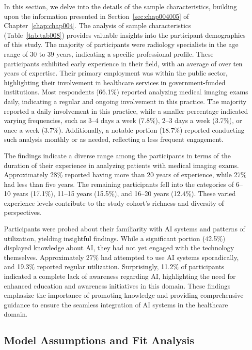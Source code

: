 In this section, we delve into the details of the sample characteristics, building upon the information presented in Section~\ref{sec:chap004005} of Chapter~\ref{chap:chap004}.
The analysis of sample characteristics (Table~\ref{tab:tab008}) provides valuable insights into the participant demographics of this study.
The majority of participants were radiology specialists in the age range of 30 to 39 years, indicating a specific professional profile.
These participants exhibited early experience in their field, with an average of over ten years of expertise.
Their primary employment was within the public sector, highlighting their involvement in healthcare services in government-funded institutions.
Most respondents (66.1\%) reported analyzing medical imaging exams daily, indicating a regular and ongoing involvement in this practice.
The majority reported a daily involvement in this practice, while a smaller percentage indicated varying frequencies, such as 3--4 days a week (7.8\%), 2--3 days a week (3.7\%), or once a week (3.7\%).
Additionally, a notable portion (18.7\%) reported conducting such analysis monthly or as needed, reflecting a less frequent engagement.

The findings indicate a diverse range among the participants in terms of the duration of their experience in analyzing patients with medical imaging exams.
Approximately 28\% reported having more than 20 years of experience, while 27\% had less than five years.
The remaining participants fell into the categories of 6--10 years (17.1\%), 11--15 years (15.5\%), and 16--20 years (12.4\%).
These varied experience levels contribute to the study cohort's richness and diversity of perspectives.

Participants were probed about their familiarity with \ac{AI} systems and patterns of utilization, yielding insightful findings.
While a significant portion (42.5\%) displayed knowledge about \ac{AI}, they had not yet engaged with the technology themselves.
Approximately 27\% had attempted to use \ac{AI} systems sporadically, and 19.3\% reported regular utilization.
Surprisingly, 11.2\% of participants indicated a complete lack of awareness regarding \ac{AI}, highlighting the need for enhanced education and awareness initiatives in this domain.
These findings emphasize the importance of promoting knowledge and providing comprehensive guidance to ensure the seamless integration of \ac{AI} systems in the healthcare domain.

\subsection{Model Assumptions and Fit Analysis}
\label{chap:app002004001}

